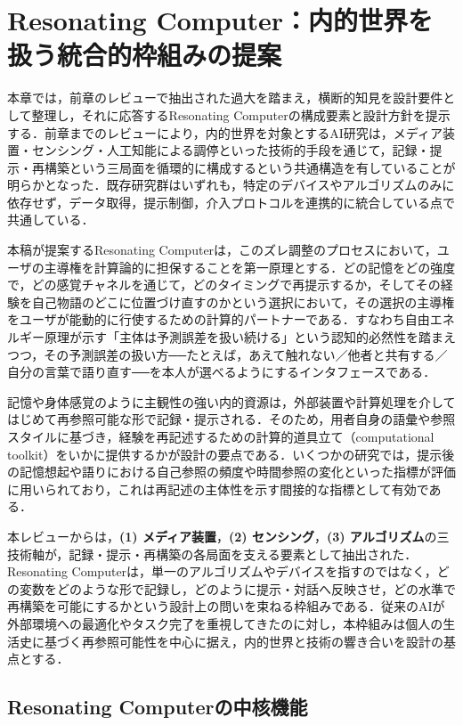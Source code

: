 \documentclass[originalpaper]{jsaiart}
\begin{document}
\section{Resonating Computer：内的世界を扱う統合的枠組みの提案}\label{sec:rescomp}
本章では，前章のレビューで抽出された過大を踏まえ，横断的知見を設計要件として整理し，それに応答するResonating Computerの構成要素と設計方針を提示する．前章までのレビューにより，内的世界を対象とするAI研究は，メディア装置・センシング・人工知能による調停といった技術的手段を通じて，記録・提示・再構築という三局面を循環的に構成するという共通構造を有していることが明らかとなった．既存研究群はいずれも，特定のデバイスやアルゴリズムのみに依存せず，データ取得，提示制御，介入プロトコルを連携的に統合している点で共通している．

本稿が提案するResonating Computerは，このズレ調整のプロセスにおいて，ユーザの主導権を計算論的に担保することを第一原理とする．どの記憶をどの強度で，どの感覚チャネルを通じて，どのタイミングで再提示するか，そしてその経験を自己物語のどこに位置づけ直すのかという選択において，その選択の主導権をユーザが能動的に行使するための計算的パートナーである．すなわち自由エネルギー原理が示す「主体は予測誤差を扱い続ける」という認知的必然性を踏まえつつ，その予測誤差の扱い方──たとえば，あえて触れない／他者と共有する／自分の言葉で語り直す──を本人が選べるようにするインタフェースである\cite{hesp2021deeplyfelt,joffily2013emotionalvalence}．

記憶や身体感覚のように主観性の強い内的資源は，外部装置や計算処理を介してはじめて再参照可能な形で記録・提示される．そのため，用者自身の語彙や参照スタイルに基づき，経験を再記述するための計算的道具立て（computational toolkit）をいかに提供するかが設計の要点である．いくつかの研究では，提示後の記憶想起や語りにおける自己参照の頻度や時間参照の変化といった指標が評価に用いられており，これは再記述の主体性を示す間接的な指標として有効である．

本レビューからは，\textbf{(1) メディア装置}，\textbf{(2) センシング}，\textbf{(3) アルゴリズム}の三技術軸が，記録・提示・再構築の各局面を支える要素として抽出された．Resonating Computerは，単一のアルゴリズムやデバイスを指すのではなく，どの変数をどのような形で記録し，どのように提示・対話へ反映させ，どの水準で再構築を可能にするかという設計上の問いを束ねる枠組みである．従来のAIが外部環境への最適化やタスク完了を重視してきたのに対し，本枠組みは個人の生活史に基づく再参照可能性を中心に据え，内的世界と技術の響き合いを設計の基点とする．

\subsection{Resonating Computerの中核機能}
\end{document}
